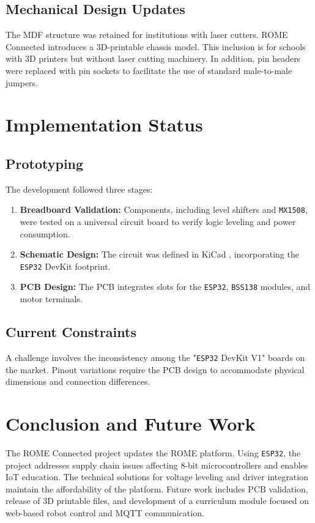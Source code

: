 \documentclass[conference]{IEEEtran}
\begin{document}
\subsection{Mechanical Design Updates}

The MDF structure was retained for institutions with laser cutters. ROME Connected introduces a 3D-printable chassis model. This inclusion is for schools with 3D printers but without laser cutting machinery. In addition, pin headers were replaced with pin sockets to facilitate the use of standard male-to-male jumpers.

\section{Implementation Status}

\subsection{Prototyping}

The development followed three stages:

\begin{enumerate}
    \item \textbf{Breadboard Validation:} Components, including level shifters and \texttt{MX1508}, were tested on a universal circuit board to verify logic leveling and power consumption.
    \item \textbf{Schematic Design:} The circuit was defined in KiCad \cite{kicad}, incorporating the \texttt{ESP32} DevKit footprint.
    \item \textbf{PCB Design:} The PCB integrates slots for the \texttt{ESP32}, \texttt{BSS138} modules, and motor terminals.
\end{enumerate}

\subsection{Current Constraints}

A challenge involves the inconsistency among the "\texttt{ESP32} DevKit V1" boards on the market. Pinout variations require the PCB design to accommodate physical dimensions and connection differences.

\section{Conclusion and Future Work}

The ROME Connected project updates the ROME platform. Using \texttt{ESP32}, the project addresses supply chain issues affecting 8-bit microcontrollers and enables IoT education. The technical solutions for voltage leveling and driver integration maintain the affordability of the platform. Future work includes PCB validation, release of 3D printable files, and development of a curriculum module focused on web-based robot control and MQTT communication.



\end{document}
